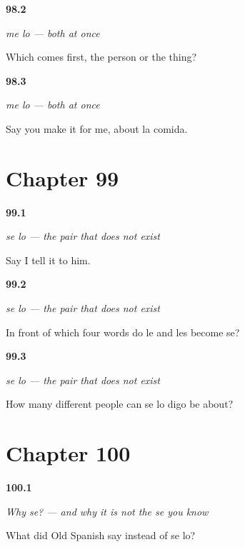 \noindent\begin{minipage}[t]{\linewidth}
\raggedright
\hypertarget{review-ES-C47-me-lo-order}{\textbf{98.2}} \emph{me lo — both at once}\par
\small Which comes first, the person or the thing?
\end{minipage}\par\medskip

\noindent\begin{minipage}[t]{\linewidth}
\raggedright
\hypertarget{review-ES-C47-me-lo-meal}{\textbf{98.3}} \emph{me lo — both at once}\par
\small Say you make it for me, about la comida.
\end{minipage}\par\medskip

\section*{Chapter 99}

\noindent\begin{minipage}[t]{\linewidth}
\raggedright
\hypertarget{review-ES-C47-se-lo-say}{\textbf{99.1}} \emph{se lo — the pair that does not exist}\par
\small Say I tell it to him.
\end{minipage}\par\medskip

\noindent\begin{minipage}[t]{\linewidth}
\raggedright
\hypertarget{review-ES-C47-se-lo-when}{\textbf{99.2}} \emph{se lo — the pair that does not exist}\par
\small In front of which four words do le and les become se?
\end{minipage}\par\medskip

\noindent\begin{minipage}[t]{\linewidth}
\raggedright
\hypertarget{review-ES-C47-se-lo-ambiguous}{\textbf{99.3}} \emph{se lo — the pair that does not exist}\par
\small How many different people can se lo digo be about?
\end{minipage}\par\medskip

\section*{Chapter 100}

\noindent\begin{minipage}[t]{\linewidth}
\raggedright
\hypertarget{review-ES-C47-por-que-se-old}{\textbf{100.1}} \emph{Why se? — and why it is not the se you know}\par
\small What did Old Spanish say instead of se lo?
\end{minipage}\par\medskip

